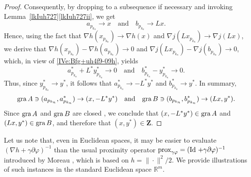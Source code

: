\documentclass[a4paper,11pt,fleqn]{article}
\newcommand{\prox}{\ensuremath{\text{\rm prox}}}
\newcommand{\Id}{\ensuremath{\operatorname{Id}}\,}
\newcommand{\RR}{\ensuremath{\mathbb{R}}}
\newcommand{\gra}{\ensuremath{\text{\rm gra}\,}}
\theoremstyle{plain}{\theorembodyfont{\rmfamily}%
\newtheorem{conjecture}[theorem]{Conjecture}}
\theoremstyle{plain}{\theorembodyfont{\rmfamily}%
\newtheorem{example}[theorem]{Example}}
\theoremstyle{plain}{\theorembodyfont{\rmfamily}%
\newtheorem{remark}[theorem]{Remark}}
\theoremstyle{plain}{\theorembodyfont{\rmfamily}%
\newtheorem{algorithm}[theorem]{Algorithm}}
\theoremstyle{plain}{\theorembodyfont{\rmfamily}%
\newtheorem{condition}[theorem]{Condition}}
\theoremstyle{plain}{\theorembodyfont{\rmfamily}%
\newtheorem{definition}[theorem]{Definition}}
\theoremstyle{plain}{\theorembodyfont{\rmfamily}
\newtheorem{problem}[theorem]{Problem}}
\theoremstyle{plain}{\theorembodyfont{\rmfamily}
\newtheorem{notation}[theorem]{Notation}}
\numberwithin{equation}{section}
\begin{document}
\begin{proof}
Consequently, by dropping to a subsequence if necessary and invoking 
Lemma~\ref{lkIuh727}\ref{lkIuh727ii}, we get
\begin{equation}
a_{{p_{k_n}}}\to x\quad\text{and}\quad b_{{p_{k_n}}}\to Lx.
\end{equation}
Hence, using the fact that $\nabla h(x_{{p_{k_n}}})\to\nabla h(x)$ 
and $\nabla j(Lx_{{p_{k_n}}})\to\nabla j(Lx)$, we derive that
$\nabla h(x_{{p_{k_n}}})-\nabla h(a_{{p_{k_n}}})\to 0$ 
and $\nabla j(Lx_{{p_{k_n}}})-\nabla j(b_{{p_{k_n}}})\to 0$, 
which, in view of \eqref{IVe:Bfg+uh4f9-09h}, yields
\begin{equation}
\label{4ekIuh711f}
a^*_{{p_{k_n}}}+L^*y^*_{{p_{k_n}}}\to 0
\quad\text{and}\quad
b^*_{{p_{k_n}}}-y_{{p_{k_n}}}^*\to 0.
\end{equation}
Thus, since $y_{{p_{k_n}}}^*\to y^*$, it follows that 
$a_{{p_{k_n}}}^*\to -L^*y^*$ and $b_{{p_{k_n}}}^*\to y^*$. 
In summary,
\begin{equation}
\gra A\ni(a_{{p_{k_n}}},a_{{p_{k_n}}}^*)\to (x,-L^*y^*)
\quad\text{and}\quad
\gra B\ni(b_{{p_{k_n}}},b_{{p_{k_n}}}^*)\to (Lx,y^*).
\end{equation}
Since $\gra A$ and $\gra B$ are closed 
\cite[Proposition~20.33(iii)]{Livre1}, we conclude that
$(x,-L^*y^*)\in\gra A$ and $(Lx,y^*)\in\gra B$, and therefore
that $(x,y^*)\in\boldsymbol{Z}$.
\end{proof}

Let us note that, even in Euclidean spaces, it may be easier to 
evaluate $(\nabla h+\gamma\partial\varphi)^{-1}$ than the usual 
proximity operator
$\prox_{\gamma\varphi}=(\Id+\gamma\partial\varphi)^{-1}$ 
introduced by Moreau \cite{Mor62b}, which is
based on $h=\|\cdot\|^2/2$. We provide illustrations of such 
instances in the standard Euclidean space $\RR^m$.
\end{document}
